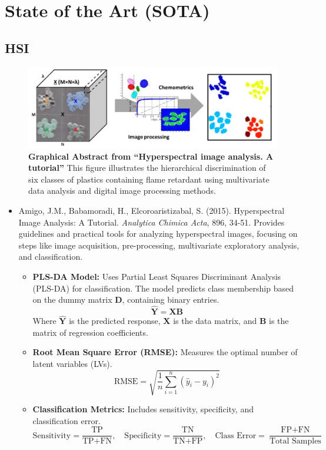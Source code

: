 \documentclass[10pt,svgnames,fragile]{beamer}
\begin{document}
\section{State of the Art (SOTA)}

\subsection{HSI}
\begin{frame}{}
\tiny
\begin{figure}
    \centering
    \includegraphics[width=0.62\linewidth]{tutorial_figure.png}
    \caption{\textbf{Graphical Abstract from “Hyperspectral image analysis. A tutorial”} This figure illustrates the hierarchical discrimination of six classes of plastics containing flame retardant using multivariate data analysis and digital image processing methods.\cite{amigoHyperspectralImageAnalysis2015}}
    \label{fig:tutorial_figure}
\end{figure}
\begin{itemize}
    \item Amigo, J.M., Babamoradi, H., Elcoroaristizabal, S. (2015). Hyperspectral Image Analysis: A Tutorial. \textit{Analytica Chimica Acta}, 896, 34-51. \href{https://www.sciencedirect.com/science/article/pii/S0003267015011691}{\color{blue}{DOI: 10.1016/j.aca.2015.09.030}}
    {\color{gray}Provides guidelines and practical tools for analyzing hyperspectral images, focusing on steps like image acquisition, pre-processing, multivariate exploratory analysis, and classification.}
    \begin{itemize} \tiny
    \item \textbf{PLS-DA Model:} Uses Partial Least Squares Discriminant Analysis (PLS-DA) for classification. The model predicts class membership based on the dummy matrix \( \mathbf{D} \), containing binary entries.
    \[
    \hat{\mathbf{Y}} = \mathbf{X} \mathbf{B}
    \]
    Where \( \hat{\mathbf{Y}} \) is the predicted response, \( \mathbf{X} \) is the data matrix, and \( \mathbf{B} \) is the matrix of regression coefficients.
    \item \textbf{Root Mean Square Error (RMSE):} Measures the optimal number of latent variables (LVs).
    \[
    \text{RMSE} = \sqrt{\frac{1}{n} \sum_{i=1}^{n} (\hat{y}_i - y_i)^2}
    \]
    \item \textbf{Classification Metrics:} Includes sensitivity, specificity, and classification error.
    \[
    \text{Sensitivity} = \frac{\text{TP}}{\text{TP} + \text{FN}}, \quad \text{Specificity} = \frac{\text{TN}}{\text{TN} + \text{FP}}, \quad \text{Class Error} = \frac{\text{FP} + \text{FN}}{\text{Total Samples}}
    \]
\end{itemize}

\end{itemize}
\end{frame}
\end{document}
